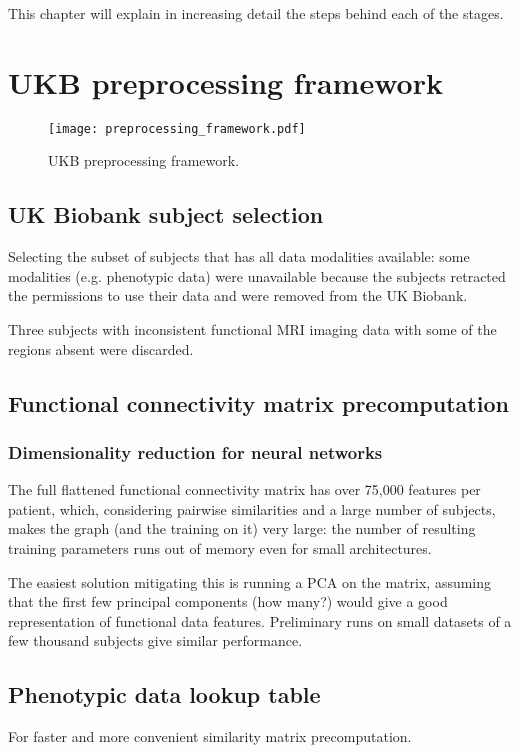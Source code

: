 This chapter will explain in increasing detail the steps behind each of the stages.

\section{UKB preprocessing framework}
\begin{figure}[h]
    \centering
    \texttt{[image: preprocessing\_framework.pdf]}
    \caption{UKB preprocessing framework.}\label{preprocessing-framework}
\end{figure}

\subsection{UK Biobank subject selection}
Selecting the subset of subjects that has all data modalities available: some modalities (e.g. phenotypic data) were unavailable because the subjects retracted the permissions to use their data and were removed from the UK Biobank.

Three subjects with inconsistent functional MRI imaging data with some of the regions absent were discarded.


\subsection{Functional connectivity matrix precomputation}

\subsubsection{Dimensionality reduction for neural networks}
The full flattened functional connectivity matrix has over 75,000 features per patient, which, considering pairwise similarities and a large number of subjects, makes the graph (and the training on it) very large: the number of resulting training parameters runs out of memory even for small architectures.

The easiest solution mitigating this is running a PCA on the matrix, assuming that the first few principal components (how many?) would give a good representation of functional data features. Preliminary runs on small datasets of a few thousand subjects give similar performance.

\subsection{Phenotypic data lookup table}
For faster and more convenient similarity matrix precomputation.


